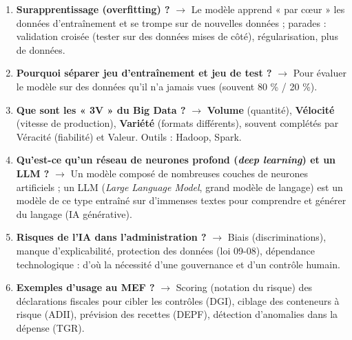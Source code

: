 \begin{enumerate}[leftmargin=*]
    \item \textbf{Surapprentissage (overfitting) ?} $\rightarrow$ Le modèle apprend « par cœur » les données d'entraînement et se trompe sur de nouvelles données ; parades : validation croisée (tester sur des données mises de côté), régularisation, plus de données.
    \item \textbf{Pourquoi séparer jeu d'entraînement et jeu de test ?} $\rightarrow$ Pour évaluer le modèle sur des données qu'il n'a jamais vues (souvent 80 \% / 20 \%).
    \item \textbf{Que sont les « 3V » du Big Data ?} $\rightarrow$ \textbf{Volume} (quantité), \textbf{Vélocité} (vitesse de production), \textbf{Variété} (formats différents), souvent complétés par Véracité (fiabilité) et Valeur. Outils : Hadoop, Spark.
    \item \textbf{Qu'est-ce qu'un réseau de neurones profond (\textit{deep learning}) et un LLM ?} $\rightarrow$ Un modèle composé de nombreuses couches de neurones artificiels ; un LLM (\textit{Large Language Model}, grand modèle de langage) est un modèle de ce type entraîné sur d'immenses textes pour comprendre et générer du langage (IA générative).
    \item \textbf{Risques de l'IA dans l'administration ?} $\rightarrow$ Biais (discriminations), manque d'explicabilité, protection des données (loi 09-08), dépendance technologique : d'où la nécessité d'une gouvernance et d'un contrôle humain.
    \item \textbf{Exemples d'usage au MEF ?} $\rightarrow$ Scoring (notation du risque) des déclarations fiscales pour cibler les contrôles (DGI), ciblage des conteneurs à risque (ADII), prévision des recettes (DEPF), détection d'anomalies dans la dépense (TGR).
\end{enumerate}

